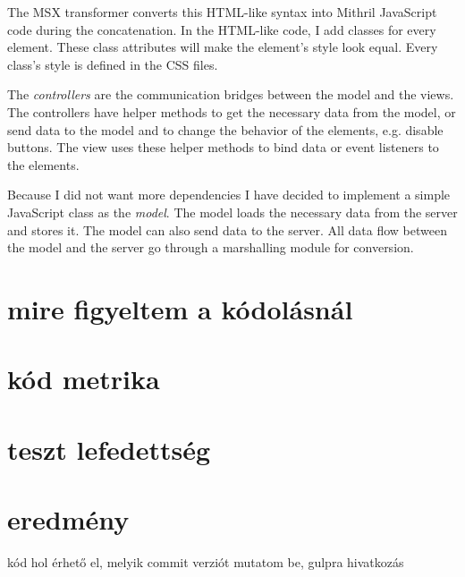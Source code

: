 The MSX transformer converts this HTML-like syntax into Mithril JavaScript code during the concatenation. In the HTML-like code, I add classes for every element. These class attributes will make the element's style look equal. Every class's style is defined in the CSS files.

The \emph{controllers} are the communication bridges between the model and the views. The controllers have helper methods to get the necessary data from the model, or send data to the model and to change the behavior of the elements, e.g. disable buttons. The view uses these helper methods to bind data or event listeners to the elements.

Because I did not want more dependencies I have decided to implement a simple JavaScript class as the \emph{model}. The model loads the necessary data from the server and stores it. The model can also send data to the server. All data flow between the model and the server go through a marshalling module for conversion.


\section{mire figyeltem a kódolásnál}
\section{kód metrika}
\section{teszt lefedettség}
\section{eredmény}
kód hol érhető el, melyik commit verziót mutatom be, gulpra hivatkozás
